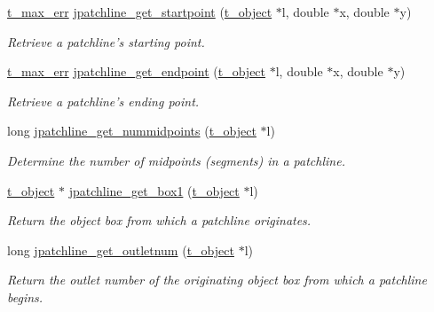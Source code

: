 \begin{DoxyCompactItemize}
\item 
\hyperlink{group__datatypes_ga73edaae82b318855cc09fac994918165}{t\_\-max\_\-err} \hyperlink{group__jpatchline_ga22e58d4f810941cbcab9c72fd6f944a8}{jpatchline\_\-get\_\-startpoint} (\hyperlink{structt__object}{t\_\-object} $\ast$l, double $\ast$x, double $\ast$y)
\begin{DoxyCompactList}\small\item\em Retrieve a patchline's starting point. \item\end{DoxyCompactList}\item 
\hyperlink{group__datatypes_ga73edaae82b318855cc09fac994918165}{t\_\-max\_\-err} \hyperlink{group__jpatchline_gae3975e752f1b21493cd7546d081e82ab}{jpatchline\_\-get\_\-endpoint} (\hyperlink{structt__object}{t\_\-object} $\ast$l, double $\ast$x, double $\ast$y)
\begin{DoxyCompactList}\small\item\em Retrieve a patchline's ending point. \item\end{DoxyCompactList}\item 
long \hyperlink{group__jpatchline_ga42dc7b0cc71d75625f6580987a61f0e9}{jpatchline\_\-get\_\-nummidpoints} (\hyperlink{structt__object}{t\_\-object} $\ast$l)
\begin{DoxyCompactList}\small\item\em Determine the number of midpoints (segments) in a patchline. \item\end{DoxyCompactList}\item 
\hyperlink{structt__object}{t\_\-object} $\ast$ \hyperlink{group__jpatchline_ga64a77181748a3f07c149942ef60053c9}{jpatchline\_\-get\_\-box1} (\hyperlink{structt__object}{t\_\-object} $\ast$l)
\begin{DoxyCompactList}\small\item\em Return the object box from which a patchline originates. \item\end{DoxyCompactList}\item 
long \hyperlink{group__jpatchline_ga901d26a483f28768c842defe9ad06cfb}{jpatchline\_\-get\_\-outletnum} (\hyperlink{structt__object}{t\_\-object} $\ast$l)
\begin{DoxyCompactList}\small\item\em Return the outlet number of the originating object box from which a patchline begins. \item\end{DoxyCompactList}\item 

\end{DoxyCompactItemize}
